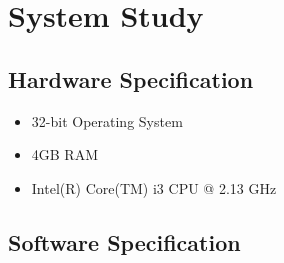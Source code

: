 \documentclass[12pt]{article}
\begin{document}
\section{System Study}
\label{sec:system}
\subsection{Hardware Specification}
\begin{itemize}
    \item 32-bit Operating System 
\item 4GB RAM 
\item Intel(R) Core(TM) i3 CPU @ 2.13 GHz
\end{itemize}

\subsection{Software Specification}
\end{document}
